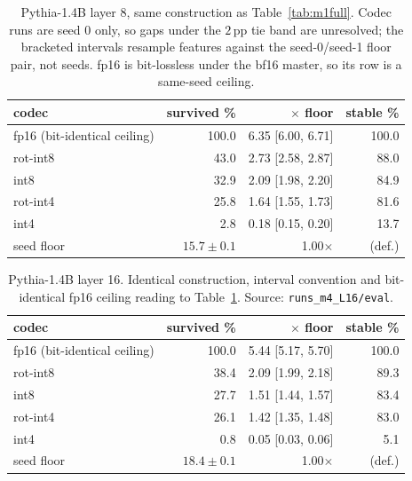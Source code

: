 \begin{table}[htbp]
\caption{Pythia-1.4B layer 8, same construction as Table~\ref{tab:m1full}. Codec runs are seed 0 only, so gaps under the $2$\,pp tie band are unresolved; the bracketed intervals resample features against the seed-0/seed-1 floor pair, not seeds. fp16 is bit-lossless under the bf16 master, so its row is a same-seed ceiling.}
\label{tab:m4l8}
\centering\small
\begin{tabular}{lrrr}
\toprule
codec & survived \% & $\times$ floor & stable \% \\
\midrule
fp16 (bit-identical ceiling) & 100.0 & 6.35 [6.00, 6.71] & 100.0 \\
rot-int8 & 43.0 & 2.73 [2.58, 2.87] & 88.0 \\
int8 & 32.9 & 2.09 [1.98, 2.20] & 84.9 \\
rot-int4 & 25.8 & 1.64 [1.55, 1.73] & 81.6 \\
int4 & 2.8 & 0.18 [0.15, 0.20] & 13.7 \\
\midrule
seed floor & $15.7 \pm 0.1$ & 1.00$\times$ & (def.) \\
\bottomrule
\end{tabular}
\end{table}

\begin{table}[htbp]
\caption{Pythia-1.4B layer 16. Identical construction, interval convention and bit-identical fp16 ceiling reading to Table~\ref{tab:m4l8}. Source: \texttt{runs\_m4\_L16/eval}.}
\label{tab:m4l16}
\centering\small
\begin{tabular}{lrrr}
\toprule
codec & survived \% & $\times$ floor & stable \% \\
\midrule
fp16 (bit-identical ceiling) & 100.0 & 5.44 [5.17, 5.70] & 100.0 \\
rot-int8 & 38.4 & 2.09 [1.99, 2.18] & 89.3 \\
int8 & 27.7 & 1.51 [1.44, 1.57] & 83.4 \\
rot-int4 & 26.1 & 1.42 [1.35, 1.48] & 83.0 \\
int4 & 0.8 & 0.05 [0.03, 0.06] & 5.1 \\
\midrule
seed floor & $18.4 \pm 0.1$ & 1.00$\times$ & (def.) \\
\bottomrule
\end{tabular}
\end{table}

